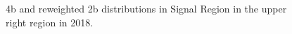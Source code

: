 \begin{figure}[ht]
 
 
    \caption{4b and reweighted 2b distributions in Signal Region in the upper right region in 2018.}
    \label{fig:upper-right-4b-SR-2018}
\end{figure}



